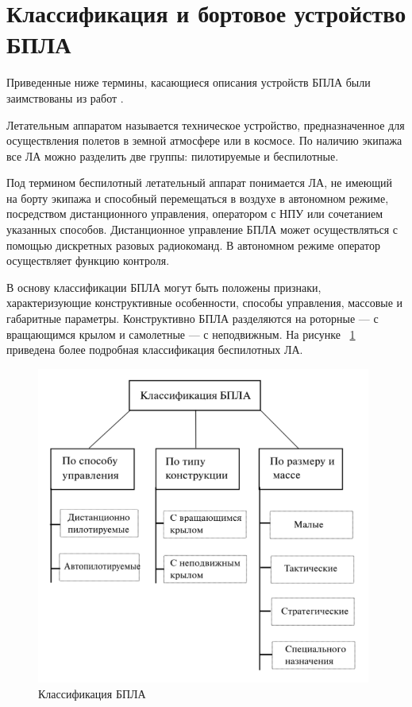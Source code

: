 \documentclass[pract, och, master]{SCWorks}
\begin{document}
\section{Классификация и бортовое устройство БПЛА}

Приведенные ниже термины, касающиеся описания устройств БПЛА были заимствованы из работ \cite{uavAvia,kbpa}.

Летательным аппаратом называется техническое устройство, предназначенное для осуществления полетов в земной 
атмосфере или в космосе. По наличию экипажа все ЛА можно разделить две группы: пилотируемые и беспилотные.

Под термином беспилотный летательный аппарат понимается ЛА, не имеющий на борту экипажа и способный перемещаться 
в воздухе в автономном режиме, посредством дистанционного управления, оператором с НПУ или сочетанием указанных 
способов. Дистанционное управление БПЛА может осуществляться с помощью дискретных разовых радиокоманд. 
В автономном режиме оператор осуществляет функцию контроля.

В основу классификации БПЛА могут быть положены признаки, характеризующие конструктивные особенности, 
способы управления,  массовые и габаритные параметры. Конструктивно БПЛА разделяются на роторные --- с 
вращающимся крылом и самолетные --- с неподвижным. На рисунке ~\ref{classification} приведена более подробная классификация беспилотных ЛА.

\begin{figure}[h]
	\centering
	\includegraphics[width=11cm]{img/uav_classification.png}
	\caption{\label{classification}%
	Классификация БПЛА}
\end{figure}
\end{document}
